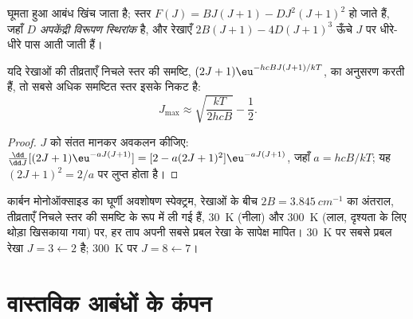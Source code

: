 \begin{definition}[अपकेंद्री विरूपण स्थिरांक]\label{def:b3:rovibrational-spectroscopy:centrifugal}
घूमता हुआ आबंध खिंच जाता है; स्तर $F(J) = BJ(J+1) - DJ^2(J+1)^2$ हो जाते हैं,
जहाँ $D$ \emph{अपकेंद्री विरूपण स्थिरांक} है,
और रेखाएँ $2B(J+1) - 4D(J+1)^3$ ऊँचे $J$ पर धीरे-धीरे पास आती
जाती हैं।
\end{definition}

\begin{proposition}\label{prop:b3:rovibrational-spectroscopy:jmax}
यदि रेखाओं की तीव्रताएँ निचले स्तर की समष्टि, $(2J+1)
\eu^{-hcBJ(J+1)/kT}$, का अनुसरण करती हैं, तो सबसे अधिक समष्टित स्तर इसके निकट है:
\[
J_{\max} \approx \sqrt{\frac{kT}{2hcB}} - \frac12.
\]
\end{proposition}

\begin{proof}
$J$ को संतत मानकर अवकलन कीजिए: $\frac{\dd}{\dd J}[(2J+1)\eu^{-aJ(J+1)}]
= [2 - a(2J+1)^2]\eu^{-aJ(J+1)}$, जहाँ $a = hcB/kT$; यह $(2J + 1)^2 =
2/a$ पर लुप्त होता है।
\end{proof}

\begin{omfigure}

{\small कार्बन मोनोऑक्साइड का घूर्णी अवशोषण स्पेक्ट्रम, रेखाओं के बीच
$2B = \qty{3.845}{cm^{-1}}$ का अंतराल, तीव्रताएँ निचले स्तर की समष्टि के रूप में ली गई हैं,
\qty{30}{K} (नीला) और \qty{300}{K} (लाल, दृश्यता के लिए थोड़ा
खिसकाया गया) पर, हर ताप अपनी सबसे प्रबल रेखा के सापेक्ष मापित। \qty{30}{K} पर सबसे प्रबल रेखा
$J = 3 \leftarrow 2$ है; \qty{300}{K} पर $J = 8 \leftarrow 7$।}
\end{omfigure}

\section{वास्तविक आबंधों के कंपन}\label{sec:b3:rovibrational-spectroscopy:real-bonds}

